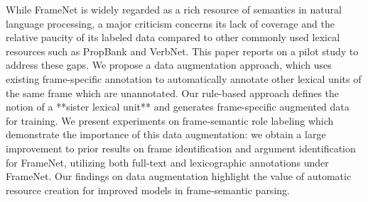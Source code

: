 While FrameNet is widely regarded as a rich resource of semantics in natural language processing, a major criticism concerns its lack of coverage and the relative paucity of its labeled data compared to other commonly used lexical resources such as PropBank and VerbNet. This paper reports on a pilot study to address these gaps. We propose a data augmentation approach, which uses existing frame-specific annotation to automatically annotate other lexical units of the same frame which are unannotated. Our rule-based approach defines the notion of a **sister lexical unit** and generates frame-specific augmented data for training. We present experiments on frame-semantic role labeling which demonstrate the importance of this data augmentation: we obtain a large improvement to prior results on frame identification and argument identification for FrameNet, utilizing both full-text and lexicographic annotations under FrameNet. Our findings on data augmentation highlight the value of automatic resource creation for improved models in frame-semantic parsing.
